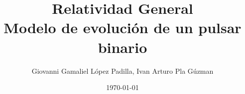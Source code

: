 \documentclass[aspectratio=169]{beamer}
\title[]{Relatividad General\\Modelo de evolución de un pulsar binario}
\author{Giovanni Gamaliel López Padilla, Ivan Arturo Pla Gúzman}
\date{\today}
\begin{document}
\begin{frame}[plain]
\maketitle
\end{frame}






\end{document}
